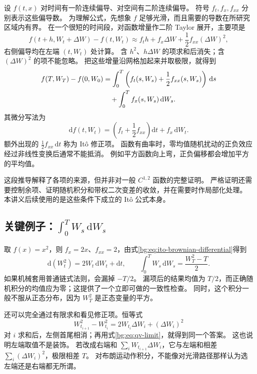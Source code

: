 \documentclass[11pt,a4paper,fontset=none]{ctexart}
\numberwithin{equation}{section}
\begin{document}
设 $f(t,x)$ 对时间有一阶连续偏导、对空间有二阶连续偏导。
符号 $f_t,f_x,f_{xx}$ 分别表示这些偏导数。
为理解公式，先想象 $f$ 足够光滑，而且需要的导数在所研究区域内有界。
在一个很短的时间段，对函数增量作二阶 Taylor 展开，主要项是
\begin{equation}
  f(t+h,W_t+\Delta W)-f(t,W_t)
  \approx f_t h+f_x\Delta W+\frac12 f_{xx}(\Delta W)^2,
  \label{bg:eq:taylor-brownian}
\end{equation}
右侧偏导均在左端 $(t,W_t)$ 处计算。
含 $h^2$、$h\Delta W$ 的项求和后消失；含 $(\Delta W)^2$ 的项不能忽略。
把这些增量沿网格加起来并取极限，就得到
\begin{align}
  f(T,W_T)-f(0,W_0)
  &=\int_0^T\left(f_t(s,W_s)+\frac12 f_{xx}(s,W_s)\right)\,\mathrm ds
  \notag\\
  &\quad+\int_0^T f_x(s,W_s)\,\mathrm dW_s.
  \label{bg:eq:ito-brownian-integral}
\end{align}
其微分写法为
\begin{equation}
  \mathrm df(t,W_t)
  =\left(f_t+\frac12f_{xx}\right)\mathrm dt+f_x\,\mathrm dW_t.
  \label{bg:eq:ito-brownian-differential}
\end{equation}
额外出现的 $\frac12 f_{xx}\,\mathrm dt$ 称为 It\^o 修正项。
函数有曲率时，零均值随机扰动的正负效应经过非线性变换后通常不能抵消。
例如平方函数向上弯，正负偏移都会增加平方的平均值。

这段推导解释了各项的来源，但并非对一般 $C^{1,2}$ 函数的完整证明。
严格证明还需要控制余项、证明随机积分和带权二次变差的收敛，并在需要时作局部化处理。
本讲义后续使用的是这些条件下成立的 It\^o 公式本身。

\subsection{关键例子：$\int_0^T W_s\,\mathrm dW_s$}
\label{bg:sub:w-dw}

取 $f(x)=x^2$，则 $f_x=2x$、$f_{xx}=2$，由式\eqref{bg:eq:ito-brownian-differential}得到
\begin{equation}
  \mathrm d(W_t^2)=2W_t\,\mathrm dW_t+\mathrm dt,
  \qquad
  \int_0^T W_s\,\mathrm dW_s=\frac{W_T^2-T}{2}.
  \label{bg:eq:w-dw-example}
\end{equation}
如果机械套用普通链式法则，会漏掉 $-T/2$。
漏项后的结果均值为 $T/2$，而正确随机积分的均值应为零；这提供了一个立即可做的一致性检查。
同时，这个积分一般不服从正态分布，因为 $W_T^2$ 是正态变量的平方。

还可以完全通过有限求和看见修正项。恒等式
\begin{equation}
  W_{t_{i+1}}^2-W_{t_i}^2
  =2W_{t_i}\Delta W_i+(\Delta W_i)^2
  \label{bg:eq:square-telescoping}
\end{equation}
对 $i$ 求和后，左侧首尾相消；再用式\eqref{bg:eq:qv-limit}，就得到同一个答案。
这也说明左端取值不是装饰。
若改成右端和 $\sum_iW_{t_{i+1}}\Delta W_i$，它与左端和相差
$\sum_i(\Delta W_i)^2$，极限相差 $T$。
对布朗运动作积分，不能像对光滑路径那样认为选左端还是右端都无所谓。
\end{document}
